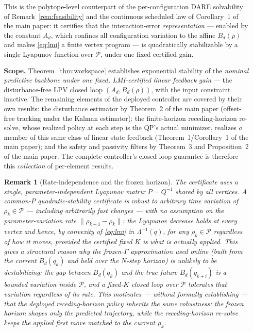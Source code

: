 \documentclass[journal]{IEEEtran}
\newtheorem{remark}{Remark}
\newcommand{\Laminv}{\Lambda^{-1}(q)}
\begin{document}
This is the polytope-level counterpart of the per-configuration DARE
solvability of Remark~\ref{rem:feasibility} and the continuous scheduled
law of Corollary~1 of the main paper: it certifies that the
interaction-error \emph{representation} --- enabled by the constant
$A_d$, which confines all configuration variation to the affine
$B_d(\rho)$ and makes \eqref{eq:lmi} a finite vertex program --- is
quadratically stabilizable by a single Lyapunov function over
$\mathcal P$, under one fixed certified gain.

\textbf{Scope.} Theorem~\ref{thm:workspace} establishes exponential
stability of the \emph{nominal predictive backbone under one fixed,
LMI-certified linear feedback gain} --- the disturbance-free LPV closed
loop $(A_d,B_d(\rho))$, with the input constraint inactive. The remaining
elements of the deployed controller are covered by their own results: the
disturbance estimator by Theorem~2 of the main paper (offset-free
tracking under the Kalman estimator); the finite-horizon receding-horizon
re-solve, whose realized policy at each step is the QP's actual
minimizer, realizes \emph{a} member of this same class of linear state
feedback (Theorem~1/Corollary~1 of the main paper); and the safety and
passivity filters by Theorem~3 and Proposition~2 of the main paper. The
complete controller's closed-loop guarantee is therefore this
\emph{collection} of per-element results.

\begin{remark}[Rate-independence and the frozen horizon]
The certificate uses a \emph{single, parameter-independent} Lyapunov
matrix $P=Q^{-1}$ shared by all vertices. A common-$P$ quadratic-stability
certificate is robust to \emph{arbitrary} time variation of
$\rho_k\in\mathcal P$ --- including arbitrarily fast changes --- with no
assumption on the parameter-variation rate $\|\rho_{k+1}-\rho_k\|$: the
Lyapunov decrease holds at every vertex and hence, by convexity of
\eqref{eq:lmi} in $\Laminv$, for any $\rho_k\in\mathcal P$ regardless of
how it moves, \emph{provided the certified fixed $K$ is what is actually
applied}. This gives a \emph{structural reason} why the
frozen-$\Gamma$ approximation used online (built from the current
$B_d(q_k)$ and held over the $N$-step horizon) is unlikely to be
destabilizing: the gap between $B_d(q_k)$ and the true future
$B_d(q_{k+i})$ is a bounded variation \emph{inside} $\mathcal P$, and a
fixed-$K$ closed loop over $\mathcal P$ tolerates that
variation regardless of its rate. This motivates --- without formally
establishing --- that the deployed receding-horizon policy inherits the
same robustness: the frozen horizon shapes only the \emph{predicted}
trajectory, while the receding-horizon re-solve keeps the
\emph{applied} first move matched to the current $\rho_k$.
\end{remark}
\end{document}
